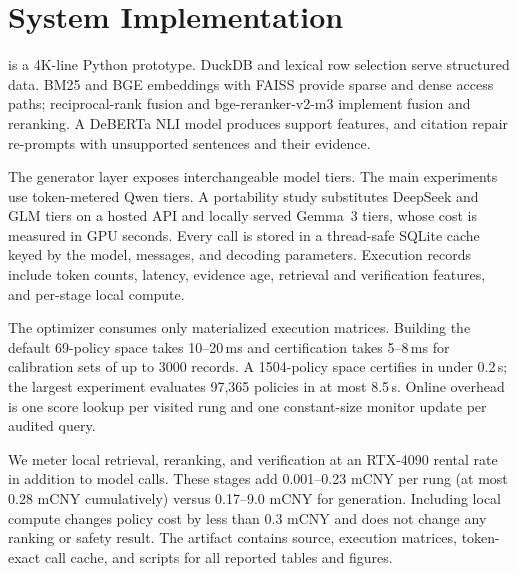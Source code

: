 \section{System Implementation}
\label{sec:system}

\system is a 4K-line Python prototype. DuckDB and lexical row selection
serve structured data. BM25 and BGE embeddings with FAISS provide sparse
and dense access paths; reciprocal-rank fusion and
bge-reranker-v2-m3 implement fusion and reranking. A DeBERTa NLI model
produces support features, and citation repair re-prompts with unsupported
sentences and their evidence.

The generator layer exposes interchangeable model tiers. The main
experiments use token-metered Qwen tiers. A portability study substitutes
DeepSeek and GLM tiers on a hosted API and locally served Gemma~3 tiers,
whose cost is measured in GPU seconds. Every call is stored in a
thread-safe SQLite cache keyed by the model, messages, and decoding
parameters. Execution records include token counts, latency, evidence age,
retrieval and verification features, and per-stage local compute.

The optimizer consumes only materialized execution matrices. Building the
default 69-policy space takes 10--20\,ms and certification takes 5--8\,ms
for calibration sets of up to 3000 records. A 1504-policy space certifies
in under 0.2\,s; the largest experiment evaluates 97,365 policies in at
most 8.5\,s. Online overhead is one score lookup per visited rung and one
constant-size monitor update per audited query.

We meter local retrieval, reranking, and verification at an RTX-4090 rental
rate in addition to model calls. These stages add 0.001--0.23 mCNY per rung
(at most 0.28 mCNY cumulatively) versus 0.17--9.0 mCNY for generation.
Including local compute changes policy cost by less than 0.3 mCNY and does
not change any ranking or safety result. The artifact contains source,
execution matrices, token-exact call cache, and scripts for all reported
tables and figures.
